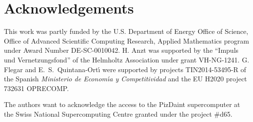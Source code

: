 \section*{Acknowledgements}
This work was partly funded by the U.S. Department
of Energy Office of Science, Office of Advanced Scientific Computing
Research, Applied Mathematics program under Award Number
DE-SC-0010042.
H. Anzt was supported by the ``Impuls und Vernetzungsfond'' of the Helmholtz 
Association under grant VH-NG-1241.
G. Flegar and E.~S.~Quintana-Ort\'{\i}
were supported by 
projects TIN2014-53495-R of the Spanish {\em Ministerio de Econom\'{\i}a y 
Competitividad}
and the EU H2020 project 732631 OPRECOMP.

The authors want to acknowledge the access to the PizDaint supercomputer at the 
Swiss National Supercomputing Centre granted under the project \#d65.
